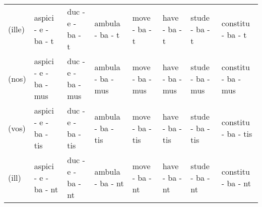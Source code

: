 \documentclass[a4paper, landscape]{article}
\begin{document}
\begin{landscape}
\begin{table}[]
\begin{tabular}{llllllll}
	(ille)	& aspici - e - ba - t		& duc - e - ba - t		& ambula - ba - t	& move - ba - t		& have - ba - t		& stude - ba - t 	& constitu - ba - t \\
	(nos)	& aspici - e - ba - mus		& duc - e - ba - mus	& ambula - ba - mus & move - ba - mus	& have - ba - mus	& stude - ba - mus  & constitu - ba - mus \\
	(vos)	& aspici - e - ba - tis		& duc - e - ba - tis	& ambula - ba - tis	& move - ba - tis	& have - ba - tis 	& stude - ba - tis  & constitu - ba - tis  \\
	(ill)	& aspici - e - ba - nt		& duc - e - ba - nt 	& ambula - ba - nt	& move - ba - nt 	& have - ba - nt	& stude - ba - nt	& constitu - ba - nt \\

\end{tabular}
\end{table}
\end{landscape}
\end{document}

